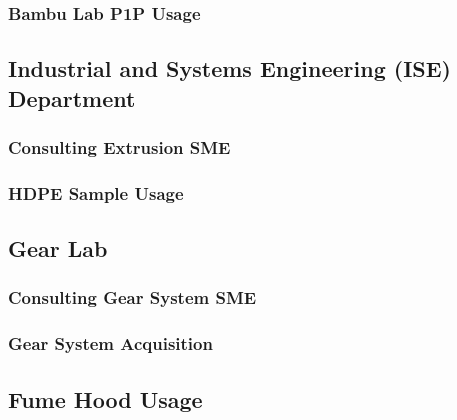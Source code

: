 \subsubsection{Bambu Lab P1P Usage\label{sec:methedology:externalLabs:eed:bambuUsage}}

\subsection{Industrial and Systems Engineering (ISE) Department\label{sec:methedology:externalLabs:ise}}

\subsubsection{Consulting Extrusion SME\label{sec:methedology:externalLabs:ise:consultingExtrusionSME}}

\subsubsection{HDPE Sample Usage\label{sec:methedology:externalLabs:ise:hdpeSampleUsage}}

\subsection{Gear Lab\label{sec:methedology:externalLabs:gearLab}}

\subsubsection{Consulting Gear System SME\label{sec:methedology:externalLabs:gearLab:consultingGearSystemSME}}

\subsubsection{Gear System Acquisition\label{sec:methedology:externalLabs:gearLab:gearSystemAcquisition}}

\subsection{Fume Hood Usage\label{sec:methedology:externalLabs:fumeHoodUsage}}
